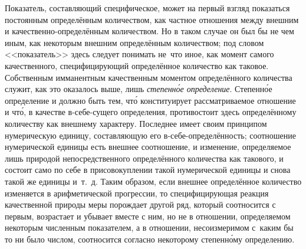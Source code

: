 Показатель, составляющий специфическое, может на первый взгляд показаться
постоянным определённым количеством, как частное отношения между внешним и
качественно-определённым количеством. Но в таком случае он был бы не чем иным,
как некоторым внешним определённым количеством; под словом <<показатель>> здесь
следует понимать не~что иное, как момент самого качественного, специфицирующий
определённое количество как таковое. Собственным имманентным качественным
моментом определённого количества служит, как это оказалось выше, лишь
{\em степенн\'{о}е определение}. Степенн\'{о}е определение и должно быть тем,
чт\'{о} конституирует рассматриваемое отношение и чт\'{о}, в качестве
в-себе-сущего определения, противостоит здесь определённому количеству как
внешнему характеру. Последнее имеет своим принципом нумерическую единицу,
составляющую его в-себе-определённость; соотношение нумерической единицы есть
внешнее соотношение, и изменение, определяемое лишь природой непосредственного
определённого количества как такового, и состоит само по себе в присовокуплении
такой нумерической единицы и снова такой же единицы и~т.~д. Таким образом, если
внешнее определённое количество изменяется в арифметической прогрессии, то
специфицирующая реакция качественной природы меры порождает другой ряд, который
соотносится с первым, возрастает и убывает вместе с ним, но не в отношении,
определяемом некоторым численным показателем, а в отношении, несоизмеримом
с~каким бы то ни было числом, соотносится согласно некоторому степенн\'{о}му
определению.

\subsubsection[Примечание]{}


